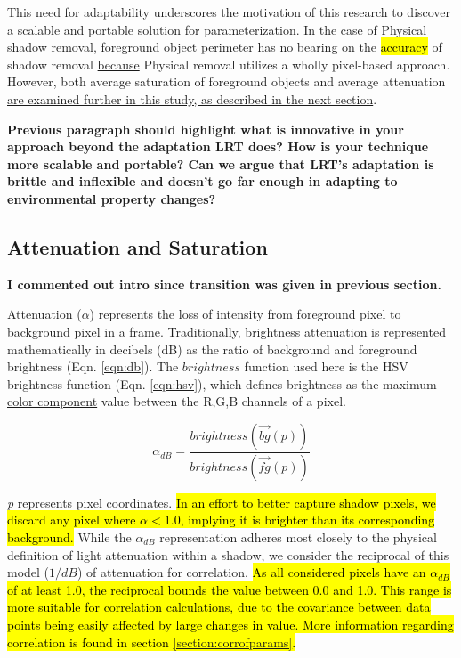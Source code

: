 \documentclass[12pt]{report}
\newcommand{\comment}[1]
           {\par {\bfseries \color{blue} #1 \par}}
\begin{document}
This need for adaptability underscores the motivation of this research to discover a scalable and portable solution for parameterization. In the case of Physical shadow removal, foreground object perimeter has no bearing on the \hl{accuracy} of shadow removal \underline{because} Physical removal utilizes a wholly pixel-based approach. However, both average saturation of foreground objects and average attenuation \underline{are examined further in this study, as described in the next section}.

\comment{Previous paragraph should highlight what is innovative in your approach beyond the adaptation LRT does?  How is your technique more scalable and portable?  Can we argue that LRT's adaptation is brittle and inflexible and doesn't go far enough in adapting to environmental property changes?}

\subsection{Attenuation and Saturation}

\comment{I commented out intro since transition was given in previous section.}

 Attenuation ($\alpha$) represents the loss of intensity from foreground pixel to background pixel in a frame. Traditionally, brightness attenuation is represented mathematically in decibels (dB) as the ratio of background and foreground brightness (Eqn. \ref{eqn:db}). The \underline{$brightness$} function used here is the HSV brightness function (Eqn. \ref{eqn:hsv}), which defines brightness as the maximum \underline{color component} value between the R,G,B channels of a pixel. 

\begin{equation}
\alpha_{dB} = \dfrac{brightness(\vec{bg}(p))}{brightness(\vec{fg}(p))}
\label{eqn:db}
\end{equation}

\textit{p} represents pixel coordinates. \hl{In an effort to better capture shadow pixels, we discard any pixel where $\alpha < 1.0$, implying it is brighter than its corresponding background.} While the $\alpha_{dB}$ representation adheres most closely to the physical definition of light attenuation within a shadow, we consider the reciprocal of this model ($1/dB$) of attenuation for correlation. \hl{As all considered pixels have an $\alpha_{dB}$ of at least 1.0, the reciprocal bounds the value between 0.0 and 1.0. This range is more suitable for correlation calculations, due to the covariance between data points being easily affected by large changes in value. More information regarding correlation is found in section \ref{section:corrofparams}.}
\end{document}
